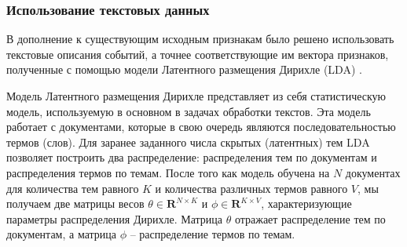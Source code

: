 

\subsubsection{Использование текстовых данных} \label{lda_topics}
В дополнение к существующим исходным признакам было решено использовать текстовые описания событий, а точнее соответствующие им вектора признаков, полученные с помощью модели Латентного размещения Дирихле (LDA) \cite{lda_orig}.
 
Модель Латентного размещения Дирихле представляет из себя статистическую модель, используемую в основном в задачах обработки текстов. Эта модель работает с документами, которые в свою очередь являются последовательностью термов (слов). Для заранее заданного числа скрытых (латентных) тем LDA позволяет построить два распределение: распределения тем по документам и распределения термов по темам. После того как модель обучена на $N$ документах для количества тем равного $K$ и количества различных термов равного $V$, мы получаем две матрицы весов $\theta \in \mathbf{R}^{N \times K}$ и $\phi \in \mathbf{R}^{K \times V}$, характеризующие параметры распределения Дирихле. Матрица $\theta$ отражает распределение тем по документам, а матрица $\phi$ -- распределение термов по темам.

